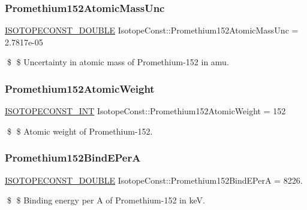 \subsubsection{\texorpdfstring{Promethium152\+Atomic\+Mass\+Unc}{Promethium152AtomicMassUnc}}
{\footnotesize\ttfamily \mbox{\hyperlink{group___isotope_const-_macros_ga8f45a7272ce02c0b4c65c44636ed719a}{I\+S\+O\+T\+O\+P\+E\+C\+O\+N\+S\+T\+\_\+\+D\+O\+U\+B\+LE}} Isotope\+Const\+::\+Promethium152\+Atomic\+Mass\+Unc = 2.\+7817e-\/05}

\$ \$ Uncertainty in atomic mass of Promethium-\/152 in amu. \mbox{\label{group___isotope_const-_promethium-_pm152_gaf9084b9627ff0f5145c46976ba8dfa97}} 
\subsubsection{\texorpdfstring{Promethium152\+Atomic\+Weight}{Promethium152AtomicWeight}}
{\footnotesize\ttfamily \mbox{\hyperlink{group___isotope_const-_macros_ga5f18360b3e99483a35c32d789e62621c}{I\+S\+O\+T\+O\+P\+E\+C\+O\+N\+S\+T\+\_\+\+I\+NT}} Isotope\+Const\+::\+Promethium152\+Atomic\+Weight = 152}

\$ \$ Atomic weight of Promethium-\/152. \mbox{\label{group___isotope_const-_promethium-_pm152_ga413655a4e3236b0a357c772fccaa9157}} 
\subsubsection{\texorpdfstring{Promethium152\+Bind\+E\+PerA}{Promethium152BindEPerA}}
{\footnotesize\ttfamily \mbox{\hyperlink{group___isotope_const-_macros_ga8f45a7272ce02c0b4c65c44636ed719a}{I\+S\+O\+T\+O\+P\+E\+C\+O\+N\+S\+T\+\_\+\+D\+O\+U\+B\+LE}} Isotope\+Const\+::\+Promethium152\+Bind\+E\+PerA = 8226.}

\$ \$ Binding energy per A of Promethium-\/152 in keV. \mbox{\label{group___isotope_const-_promethium-_pm152_ga6a6b800857813f498e40b0e74657afc4}} 
